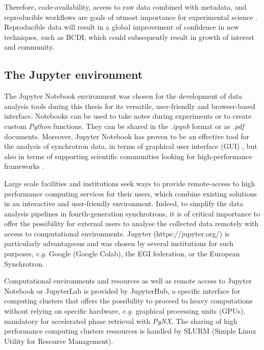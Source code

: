 Therefore, code-availability, access to raw data combined with metadata, and reproducible workflows are goals of utmost importance for experimental science \parencite{Munafo2017}.
Reproducible data will result in a global improvement of confidence in new techniques, such as BCDI, which could subsequently result in growth of interest and community.

\subsection{The Jupyter environment}

The Jupyter Notebook environment \parencite{IPython, Kluyver2016jupyter} was chosen for the development of data analysis tools during this thesis for its versatile, user-friendly and browser-based interface.
Notebooks can be used to take notes during experiments or to create custom \textit{Python} functions.
They can be shared in the \textit{.ipynb} format or as \textit{.pdf} documents.
Moreover, Jupyter Notebook has proven to be an effective tool for the analysis of synchrotron data, in terms of graphical user interface (GUI) \parencite{Martini2019a,Simonne2020}, but also in terms of supporting scientific communities looking for high-performance frameworks \parencite{jupyter_computing_4, jupyter_computing_1, jupyter_computing_3, jupyter_computing_2, 9307800}.

Large scale facilities and institutions seek ways to provide remote-access to high performance computing services for their users, which combine existing solutions in an interactive and user-friendly environment.
Indeed, to simplify the data analysis pipelines in fourth-generation synchrotrons, it is of critical importance to offer the possibility for external users to analyse the collected data remotely with access to computational environments.
Jupyter (https://jupyter.org/) is particularly advantageous and was chosen by several institutions for such purposes, \textit{e.g}. Google (Google Colab), the EGI federation, or the European Synchrotron.

Computational environments and resources as well as remote access to Jupyter Notebook or JupyterLab is provided by JupyterHub, a specific interface for computing clusters that offers the possibility to proceed to heavy computations without relying on specific hardware, \textit{e.g.} graphical processing units (GPUs), mandatory for accelerated phase retrieval with \textit{PyNX}.
The sharing of high performance computing clusters ressources is handled by SLURM (Simple Linux Utility for Resource Management).

